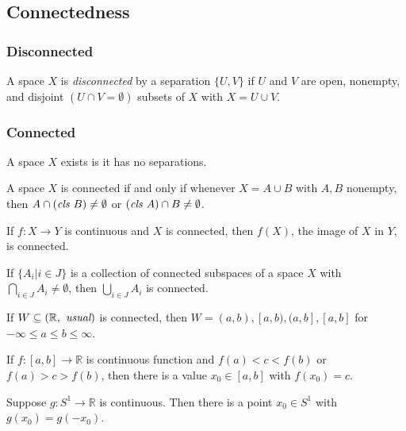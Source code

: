 \subsection{Connectedness}\label{connectedness}

\subsubsection{Disconnected}\label{disconnected}
A space $X$ is \emph{disconnected} by a separation $\{ U,V \}$ if $U$ and $V$ are open, nonempty, and disjoint $(U \cap V = \emptyset)$ subsets
of $X$ with $X=U \cup V$.

\subsubsection{Connected}\label{connected}
A space $X$ exists is it has no separations.

\begin{theorem}
A space $X$ is connected if and only if whenever $X = A \cup B$ with $A, B$ nonempty, then $A \cap (\emph{cls } B) \neq \emptyset$ or
$(\emph{cls }A) \cap B \neq \emptyset$.
\end{theorem}

\begin{theorem}
If $f:X \rightarrow Y$ is continuous and $X$ is connected, then $f(X)$, the image of $X$ in $Y$, is connected.
\end{theorem}

\begin{lemma}
\label{connectedunion}
If $\{ A_i | i \in J \}$ is a collection of connected subspaces of a space $X$ with $\bigcap_{i \in J} A_i \neq \emptyset$, then $\bigcup_{i \in J} A_i$ is connected.
\end{lemma}

\begin{proposition}
If $W \subseteq (\mathbb{R}, \emph{ usual})$ is connected, then $W = (a,b),[a,b),(a,b],[a,b]$ for $-\infty \leq a \leq b \leq \infty$.
\end{proposition}

\begin{theorem}
If $f:[a,b] \rightarrow \mathbb{R}$ is continuous function and $f(a) < c < f(b)$ or $f(a) > c > f(b)$, then there is a value $x_0 \in [a,b]$ with $f(x_0) = c$.
\end{theorem}

\begin{corollary}
Suppose $g : S^1 \rightarrow \mathbb{R}$ is continuous. Then there is a point $x_0 \in S^1$ with $g(x_0) = g(-x_0)$.
\end{corollary}

